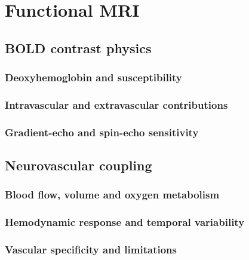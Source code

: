 \chapter{Functional MRI}
\label{ch:21}

\section{BOLD contrast physics}
\label{sec:21:bold-contrast-physics}
\subsection{Deoxyhemoglobin and susceptibility}
\subsection{Intravascular and extravascular contributions}
\subsection{Gradient-echo and spin-echo sensitivity}

\section{Neurovascular coupling}
\label{sec:21:neurovascular-coupling}
\subsection{Blood flow, volume and oxygen metabolism}
\subsection{Hemodynamic response and temporal variability}
\subsection{Vascular specificity and limitations}

